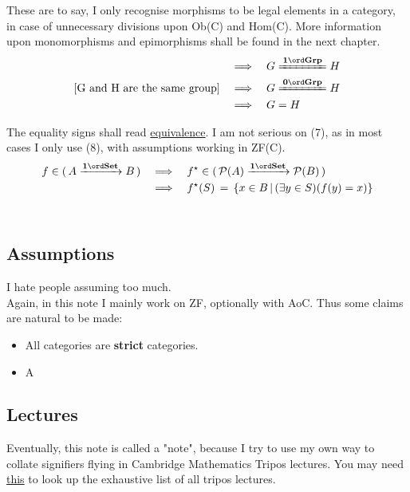 These are to say, I only recognise morphisms to be legal elements in a category, in case of unnecessary divisions upon Ob(C) and Hom(C). More information upon monomorphisms and epimorphisms shall be found in the next chapter.\\

\begin{align}
  [\text{G and H are isomorphic in groups}] &\corres G\iso{Grp} H \\
  [\text{G and H are the same group}] &\corres G\iso[0]{Grp} H \\
                                            &\corres G = H
\end{align} 

The equality signs shall read \href{https://ncatlab.org/nlab/show/equivalence}{equivalence}. I am not serious on (7), as in most cases I only use (8), with assumptions working in ZF(C). \\

\begin{align}
  f\in \col{A\func B} &\corres f^{\star}\in \col{\mathcal{P}(A) \func \mathcal{P}(B)} \\
                      &\corres f^{\star}(S)\,=\, \{x\in B \,|\, (\exists y\in S)(f(y)=x) \}
\end{align} \\

\subsection{Assumptions}

I hate people assuming too much. \\

Again, in this note I mainly work on ZF, optionally with AoC. Thus some claims are natural to be made:
\begin{itemize}
  \item All categories are \textbf{strict} categories.
  \item A
\end{itemize}

\subsection{Lectures}

Eventually, this note is called a "note", because I try to use my own way to collate signifiers flying in Cambridge Mathematics Tripos lectures. You may need \href{https://www.maths.cam.ac.uk/undergrad/files/lecturelist/current/All_Parts.pdf}{this} to look up the exhaustive list of all tripos lectures. \\

